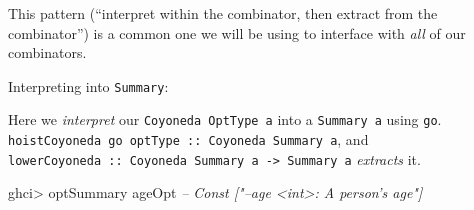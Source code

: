 \documentclass[]{article}
\newenvironment{Shaded}{}{}
\newcommand{\CommentTok}[1]{\textcolor[rgb]{0.38,0.63,0.69}{\textit{#1}}}
\newcommand{\DataTypeTok}[1]{\textcolor[rgb]{0.56,0.13,0.00}{#1}}
\newcommand{\FunctionTok}[1]{\textcolor[rgb]{0.02,0.16,0.49}{#1}}
\newcommand{\KeywordTok}[1]{\textcolor[rgb]{0.00,0.44,0.13}{\textbf{#1}}}
\newcommand{\NormalTok}[1]{#1}
\newcommand{\OtherTok}[1]{\textcolor[rgb]{0.00,0.44,0.13}{#1}}
\newcommand{\StringTok}[1]{\textcolor[rgb]{0.25,0.44,0.63}{#1}}
\begin{document}
This pattern (``interpret within the combinator, then extract from the
combinator'') is a common one we will be using to interface with \emph{all} of
our combinators.

Interpreting into \texttt{Summary}:

\begin{Shaded}
\end{Shaded}

Here we \emph{interpret} our \texttt{Coyoneda\ OptType\ a} into a
\texttt{Summary\ a} using \texttt{go}.
\texttt{hoistCoyoneda\ go\ optType\ ::\ Coyoneda\ Summary\ a}, and
\texttt{lowerCoyoneda\ ::\ Coyoneda\ Summary\ a\ -\textgreater{}\ Summary\ a}
\emph{extracts} it.

\begin{Shaded}
\begin{Highlighting}[]
\NormalTok{ghci}\FunctionTok{>}\NormalTok{ optSummary ageOpt}
\CommentTok{-- Const ["--age <int>: A person's age"]}
\end{Highlighting}
\end{Shaded}
\end{document}
